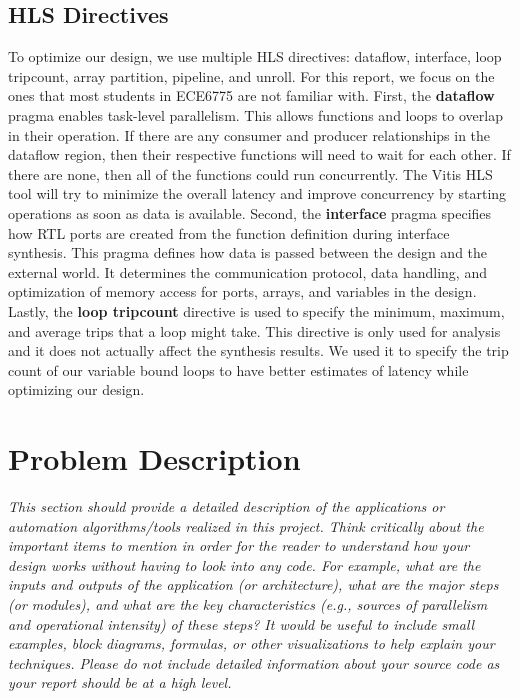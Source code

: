 \documentclass[10pt]{article}
\begin{document}
\subsection{HLS Directives}
To optimize our design, we use multiple HLS directives: dataflow, interface, loop tripcount,
array partition, pipeline, and unroll. For this report, we focus on the ones that most students 
in ECE6775 are not familiar with. First, the \textbf{dataflow} pragma enables task-level parallelism. 
This allows functions and loops to overlap in their operation. If there are any consumer and producer 
relationships in the dataflow region, then their respective functions will need to wait for each 
other. If there are none, then all of the functions could run concurrently. The Vitis HLS tool 
will try to minimize the overall latency and improve concurrency by starting operations as soon 
as data is available. Second, the \textbf{interface} pragma specifies how RTL ports are created from 
the function definition during interface synthesis. This pragma defines how data is passed between 
the design and the external world. It determines the communication protocol, data handling, and 
optimization of memory access for ports, arrays, and variables in the design. Lastly, the 
\textbf{loop tripcount} directive is used to specify the minimum, maximum, and average trips that a 
loop might take. This directive is only used for analysis and it does not actually affect the synthesis 
results. We used it to specify the trip count of our variable bound loops to have better estimates of 
latency while optimizing our design. \newline

\section{Problem Description}
\textit{This section should provide a detailed description of the applications or
automation algorithms/tools realized in this project. Think critically about the important items to
mention in order for the reader to understand how your design works without having to look into any
code. For example, what are the inputs and outputs of the application (or architecture), what are the
major steps (or modules), and what are the key characteristics (e.g., sources of parallelism and operational intensity) of these steps? It would be useful to include small examples, block diagrams, formulas,
or other visualizations to help explain your techniques. Please do not include detailed information
about your source code as your report should be at a high level.}
\end{document}
